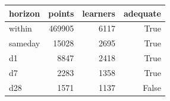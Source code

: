 \begin{tabular}{lrrr}
\toprule
horizon & points & learners & adequate \\
\midrule
within & 469905 & 6117 & True \\
sameday & 15028 & 2695 & True \\
d1 & 8847 & 2418 & True \\
d7 & 2283 & 1358 & True \\
d28 & 1571 & 1137 & False \\
\bottomrule
\end{tabular}
